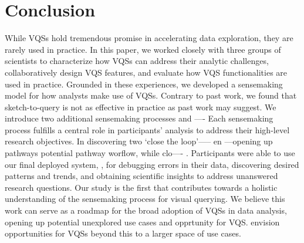 \section{Conclusion\label{sec:conclusion}}
While VQSs hold tremendous promise in accelerating data exploration, they are rarely used in practice. In this paper, we worked closely with three groups of scientists to characterize how VQSs can address their analytic challenges, collaboratively design VQS features, and evaluate how VQS functionalities are used in practice. Grounded in these experiences, we developed a sensemaking model for how analysts make use of VQSs. Contrary to past work, we found that sketch-to-query is not as effective in practice as past work may suggest. We introduce two additional sensemaking processes and  ---- Each sensemaking process fulfills a central role in participants' analysis to address their high-level research objectives. In discovering two `close the loop'----- en ---opening up pathways  potential pathway worflow, while clo---- . Participants were able to use our final deployed system, \zvpp, for debugging errors in their data, discovering desired patterns and trends, and obtaining scientific insights to address unanswered research questions. Our study is the first that contributes towards a holistic understanding of the sensemaking process for visual querying. We believe this work can serve as a roadmap for the broad adoption of VQSs in data analysis, opening up potential unexplored use cases and opprtunity for VQS. envision opportunities for VQSs beyond this to a larger space of use cases.





